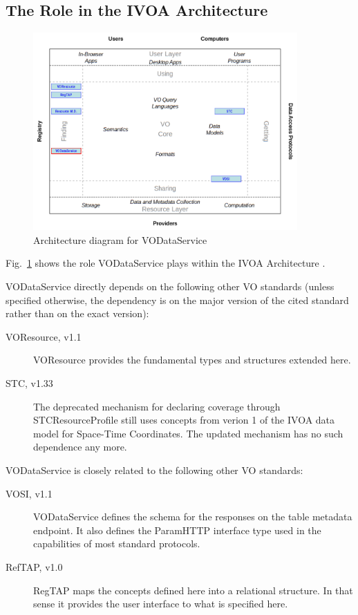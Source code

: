\documentclass[11pt,a4paper]{ivoa}
\begin{document}
\subsection{The Role in the IVOA Architecture}

\begin{figure}
\centering
\includegraphics[width=0.9\textwidth]{role_diagram.pdf}
\caption{Architecture diagram for VODataService}
\label{fig:archdiag}
\end{figure}

Fig.~\ref{fig:archdiag} shows the role VODataService plays within the
IVOA Architecture \citep{note:VOARCH}.

VODataService directly depends on the following other VO standards
(unless specified otherwise, the dependency is on the major version of
the cited standard rather than on the exact version):

\begin{description}
\item[VOResource, v1.1 \citep{2018ivoa.spec.0625P}] VOResource provides
the fundamental types and structures extended here.
\item[STC, v1.33 \citep{2007ivoa.spec.1030R}] The deprecated mechanism
for declaring coverage through STCResourceProfile still uses concepts
from verion 1 of the IVOA data model for Space-Time Coordinates.  The
updated mechanism has no such dependence any more.
\end{description}

VODataService is closely related to the following other VO standards:

\begin{description}
\item[VOSI, v1.1 \citep{2017ivoa.spec.0524G}] VODataService defines the
schema for the responses on the table metadata endpoint.  It also
defines the ParamHTTP interface type used in the capabilities of most
standard protocols.
\item[RefTAP, v1.0 \citep{2014ivoa.spec.1208D}] RegTAP maps the concepts
defined here into a relational structure.  In that sense it provides the
user interface to what is specified here.
\end{description}
\end{document}
